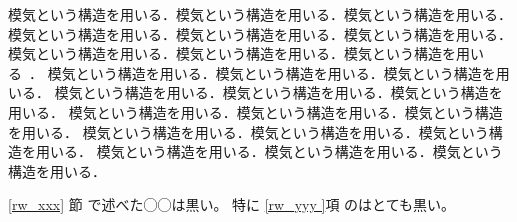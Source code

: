 模気という構造を用いる．模気という構造を用いる．模気という構造を用いる．
模気という構造を用いる．模気という構造を用いる．模気という構造を用いる．
模気という構造を用いる．模気という構造を用いる．模気という構造を用いる~\cite{sasada2005yarv}．
模気という構造を用いる．模気という構造を用いる．模気という構造を用いる．
模気という構造を用いる．模気という構造を用いる．模気という構造を用いる．
模気という構造を用いる．模気という構造を用いる．模気という構造を用いる．
模気という構造を用いる．模気という構造を用いる．模気という構造を用いる．
模気という構造を用いる．模気という構造を用いる．模気という構造を用いる．

\ref{rw_xxx} 節 で述べた◯◯は黒い。
特に \ref{rw_yyy }項 のはとても黒い。
